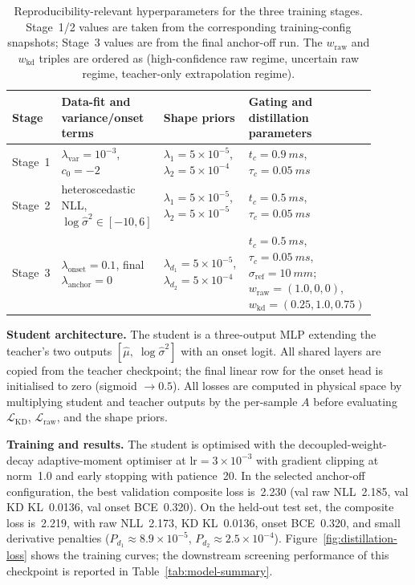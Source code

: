 \documentclass[english, 12pt, a4paper, elec, utf8, a-2b, online]{aaltothesis}
\begin{document}
\begin{table}[t]
\centering
\footnotesize
\setlength{\tabcolsep}{3pt}
\renewcommand{\arraystretch}{1.18}
\begin{tabular}{@{}L{0.12\linewidth}L{0.24\linewidth}L{0.24\linewidth}L{0.30\linewidth}@{}}
\toprule
Stage & Data-fit and variance/onset terms & Shape priors & Gating and distillation parameters \\
\midrule
Stage~1 &
\(\lambda_{\mathrm{var}}=10^{-3}\), \(c_0=-2\) &
\(\lambda_1=5\times10^{-5}\), \(\lambda_2=5\times10^{-4}\) &
\(t_c=\SI{0.9}{ms}\), \(\tau_c=\SI{0.05}{ms}\) \\
Stage~2 &
heteroscedastic NLL, \(\log\hat{\sigma}^2\in[-10,6]\) &
\(\lambda_1=5\times10^{-5}\), \(\lambda_2=5\times10^{-5}\) &
\(t_c=\SI{0.5}{ms}\), \(\tau_c=\SI{0.05}{ms}\) \\
Stage~3 &
\(\lambda_{\mathrm{onset}}=0.1\), final \(\lambda_{\mathrm{anchor}}=0\) &
\(\lambda_{d_1}=5\times10^{-5}\), \(\lambda_{d_2}=5\times10^{-4}\) &
\(t_c=\SI{0.5}{ms}\), \(\tau_c=\SI{0.05}{ms}\), \(\sigma_{\mathrm{ref}}=\SI{10}{mm}\); \(w_{\mathrm{raw}}=(1.0,0,0)\), \(w_{\mathrm{kd}}=(0.25,1.0,0.75)\) \\
\bottomrule
\end{tabular}
\caption{Reproducibility-relevant hyperparameters for the three training stages. Stage~1/2 values are taken from the corresponding training-config snapshots; Stage~3 values are from the final anchor-off run. The \(w_{\mathrm{raw}}\) and \(w_{\mathrm{kd}}\) triples are ordered as (high-confidence raw regime, uncertain raw regime, teacher-only extrapolation regime).}
\label{tab:training-hyperparameters}
\end{table}

\textbf{Student architecture.}  The student is a three-output MLP extending the teacher's two outputs $[\hat\mu,\;\log\hat\sigma^2]$ with an onset logit. All shared layers are copied from the teacher checkpoint; the final linear row for the onset head is initialised to zero (sigmoid $\to0.5$). All losses are computed in physical space by multiplying student and teacher outputs by the per-sample $A$ before evaluating $\mathcal{L}_{\mathrm{KD}}$, $\mathcal{L}_{\mathrm{raw}}$, and the shape priors.

\textbf{Training and results.}  The student is optimised with the decoupled-weight-decay adaptive-moment optimiser at $\mathrm{lr}=3\times10^{-3}$ with gradient clipping at norm~1.0 and early stopping with patience~20. In the selected anchor-off configuration, the best validation composite loss is~2.230 (val raw NLL~2.185, val KD KL~0.0136, val onset BCE~0.320). On the held-out test set, the composite loss is~2.219, with raw NLL~2.173, KD KL~0.0136, onset BCE~0.320, and small derivative penalties ($P_{d_1}\approx8.9\times10^{-5}$, $P_{d_2}\approx2.5\times10^{-4}$). Figure~\ref{fig:distillation-loss} shows the training curves; the downstream screening performance of this checkpoint is reported in Table~\ref{tab:model-summary}.
\end{document}
